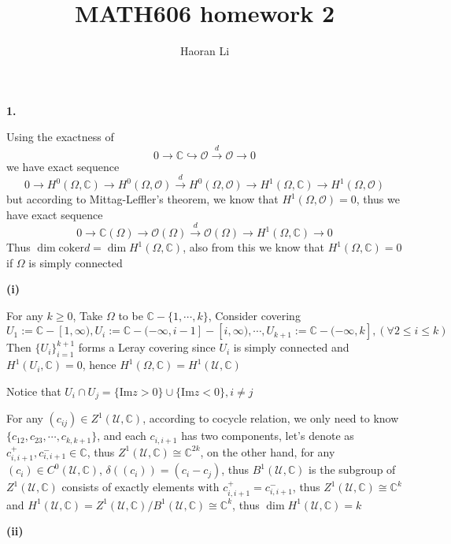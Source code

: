 \documentclass[12pt]{article}
\title{MATH606 homework 2}
\author{Haoran Li}
\date{}
\begin{document}
\maketitle

\textbf{1.} \par
Using the exactness of
\[
0\rightarrow \mathbb{C}\hookrightarrow\mathcal{O}\xrightarrow{d}\mathcal{O}\rightarrow 0
\]
we have exact sequence
\[
0\rightarrow H^{0}(\Omega,\mathbb{C})\rightarrow H^{0}(\Omega,\mathcal{O})\xrightarrow{d}H^{0}(\Omega,\mathcal{O})\rightarrow H^{1}(\Omega,\mathbb{C})\rightarrow H^{1}(\Omega,\mathcal{O})
\]
but according to Mittag-Leffler's theorem, we know that $H^{1}(\Omega,\mathcal{O})=0$, thus we have exact sequence
\[
0\rightarrow \mathbb{C}(\Omega)\rightarrow\mathcal{O}(\Omega)\xrightarrow{d}\mathcal{O}(\Omega)\rightarrow H^{1}(\Omega,\mathbb{C})\rightarrow 0
\]
Thus $\dim\mathrm{coker}d=\dim H^{1}(\Omega,\mathbb{C})$, also from this we know that $H^{1}(\Omega,\mathbb{C})=0$ if $\Omega$ is simply connected \par
\textbf{(i)} \par
For any $k\geq 0$, Take $\Omega$ to be $\mathbb{C}-\{1,\cdots,k\}$, Consider covering $$U_{1}:=\mathbb{C}-[1,\infty), U_{i}:=\mathbb{C}-(-\infty,i-1]-[i,\infty), \cdots, U_{k+1}:=\mathbb{C}-(-\infty,k], \left(\forall 2\leq i\leq k\right)$$Then $\{U_{i}\}_{i=1}^{k+1}$ forms a Leray covering since $U_{i}$ is simply connected and $H^{1}(U_{i},\mathbb{C})=0$, hence $H^{1}(\Omega,\mathbb{C})=H^{1}(\mathcal{U},\mathbb{C})$ \par
Notice that $U_{i}\cap U_{j}=\{\mathrm{Im}z>0\}\cup\{\mathrm{Im}z<0\}, i\neq j$ \par
For any $(c_{ij})\in Z^{1}(\mathcal{U},\mathbb{C})$, according to cocycle relation, we only need to know $\{c_{12},c_{23},\cdots,c_{k,k+1}\}$, and each $c_{i,i+1}$ has two components, let's denote as $c_{i,i+1}^{+},c_{i,i+1}^{-}\in \mathbb{C}$, thus $Z^{1}(\mathcal{U},\mathbb{C})\cong \mathbb{C}^{2k}$, on the other hand, for any $(c_{i})\in C^{0}(\mathcal{U},\mathbb{C})$, $\delta\left((c_{i})\right)=(c_{i}-c_{j})$, thus $B^{1}(\mathcal{U},\mathbb{C})$ is the subgroup of $Z^{1}(\mathcal{U},\mathbb{C})$ consists of exactly elements with $c_{i,i+1}^{+}=c_{i,i+1}^{-}$, thus $Z^{1}(\mathcal{U},\mathbb{C})\cong \mathbb{C}^{k}$ and $H^{1}(\mathcal{U},\mathbb{C})=Z^{1}(\mathcal{U},\mathbb{C})/B^{1}(\mathcal{U},\mathbb{C})\cong\mathbb{C}^{k}$, thus $\dim H^{1}(\mathcal{U},\mathbb{C})=k$ \par
\textbf{(ii)} \par
\end{document}

